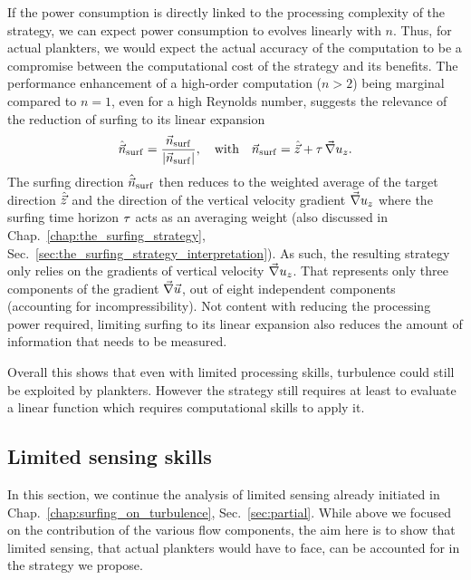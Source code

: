 If the power consumption is directly linked to the processing complexity of the strategy, we can expect power consumption to evolves linearly with $n$.
Thus, for actual plankters, we would expect the actual accuracy of the computation to be a compromise between the computational cost of the strategy and its benefits.
The performance enhancement of a high-order computation ($n > 2$) being marginal compared to $n = 1$, even for a high Reynolds number, suggests the relevance of the reduction of surfing to its linear expansion
\begin{equation}\label{eq:exp_series_n_1}
	\hat{\vec{n}}_{\mathrm{surf}} = \frac{\vec{n}_{\mathrm{surf}}}{\lvert\vec{n}_{\mathrm{surf}}\rvert}, \quad \text{with} \quad 
	\vec{n}_{\mathrm{surf}} = \hat{\vec{z}} + \tau \, \vec{\nabla} u_z.
\end{equation}
The surfing direction $\hat{\vec{n}}_{\mathrm{surf}}$ then reduces to the weighted average of the target direction $\hat{\vec{z}}$ and the direction of the vertical velocity gradient $\vec{\nabla} u_z$ where the surfing time horizon $\tau$ acts as an averaging weight (also discussed in Chap.~\ref{chap:the_surfing_strategy}, Sec.~\ref{sec:the_surfing_strategy_interpretation}).
As such, the resulting strategy only relies on the gradients of vertical velocity $\vec{\nabla} u_z$. 
That represents only three components of the gradient $\vec{\nabla} \vec{u}$, out of eight independent components (accounting for incompressibility).
Not content with reducing the processing power required, limiting surfing to its linear expansion also reduces the amount of information that needs to be measured.

Overall this shows that even with limited processing skills, turbulence could still be exploited by plankters.
However the strategy still requires at least to evaluate a linear function which requires computational skills to apply it.

\subsection{Limited sensing skills}\label{sec:sensing_limitations}

In this section, we continue the analysis of limited sensing already initiated in Chap.~\ref{chap:surfing_on_turbulence}, Sec.~\ref{sec:partial}.
While above we focused on the contribution of the various flow components, the aim here is to show that limited sensing, that actual plankters would have to face, can be accounted for in the strategy we propose.

